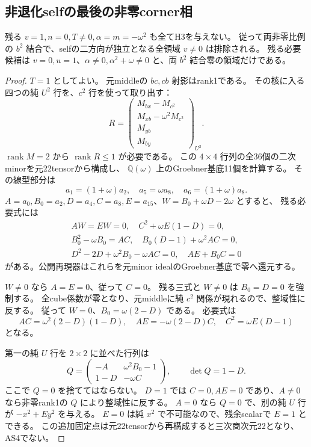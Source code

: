 \subsection{非退化selfの最後の非零corner相}
\label{subsec:cubic-third-root-nonunit-isolated}
\begin{theorem}[比例非退化selfの完成した排除]
\label{thm:cubic-third-root-nonunit-proportional-nondegenerate-empty}
残る $v=1,n=0,T\ne0,\alpha=m=-\omega^2$ も全てH3を与えない。
従って両非零比例の $b^2$ 結合で、selfの二方向が独立となる全領域 $v\ne0$ は排除される。
残る必要候補は $v=0,u=1$、$\alpha\ne0,\alpha^2+\omega\ne0$ と、両 $b^2$ 結合零の領域だけである。
\end{theorem}
\begin{proof}
$T=1$ としてよい。
元middleの $bc,cb$ 射影はrank1である。
その核に入る四つの純 $U^2$ 行を、$c^2$ 行を使って取り出す：
\[
 R=\begin{pmatrix}
 M_{bx}-M_{c^2}\\ M_{xb}-\omega^2M_{c^2}\\M_{yb}\\M_{by}
 \end{pmatrix}_{U^2}.
\]
$\operatorname{rank}M=2$ から $\operatorname{rank}R\le1$ が必要である。
この $4\times4$ 行列の全36個の二次minorを元22tensorから構成し、
$\mathbb Q(\omega)$ 上のGroebner基底11個を計算する。
その線型部分は
\[
 a_1=(1+\omega)a_2,\quad a_5=\omega a_8,\quad a_6=(1+\omega)a_8.
\]
$A=a_0,B_0=a_2,D=a_4,C=a_8,E=a_{15}$、$W=B_0+\omega D-2\omega$ とすると、
残る必要式には
\begin{gather*}
 AW=EW=0,\quad C^2+\omega E(1-D)=0,\\
 B_0^2-\omega B_0=AC,\quad B_0(D-1)+\omega^2AC=0,\\
 D^2-2D+\omega^2B_0-\omega AC=0,\quad AE+B_0C=0
\end{gather*}
がある。公開再現器はこれらを元minor idealのGroebner基底で零へ還元する。

$W\ne0$ なら $A=E=0$、従って $C=0$。
残る三式と $W\ne0$ は $B_0=D=0$ を強制する。
全cube係数が零となり、元middleに純 $c^2$ 関係が現れるので、整域性に反する。
従って $W=0$、$B_0=\omega(2-D)$ である。
必要式は
\[
 AC=\omega^2(2-D)(1-D),\quad
 AE=-\omega(2-D)C,\quad C^2=\omega E(D-1)
\]
となる。

第一の純 $U$ 行を $2\times2$ に並べた行列は
\[
 Q=\begin{pmatrix}-A&\omega^2B_0-1\\1-D&-\omega C\end{pmatrix},
 \qquad \det Q=1-D.
\]
ここで $Q=0$ を捨ててはならない。
$D=1$ では $C=0,AE=0$ であり、$A\ne0$ なら非零rank1の $Q$ により整域性に反する。
$A=0$ なら $Q=0$ で、別の純 $U$ 行が $-x^2+Ey^2$ を与える。
$E=0$ は純 $x^2$ で不可能なので、残余scalarで $E=1$ とできる。
この追加固定点は元22tensorから再構成すると三次商次元22となり、AS4でない。


\end{proof}
